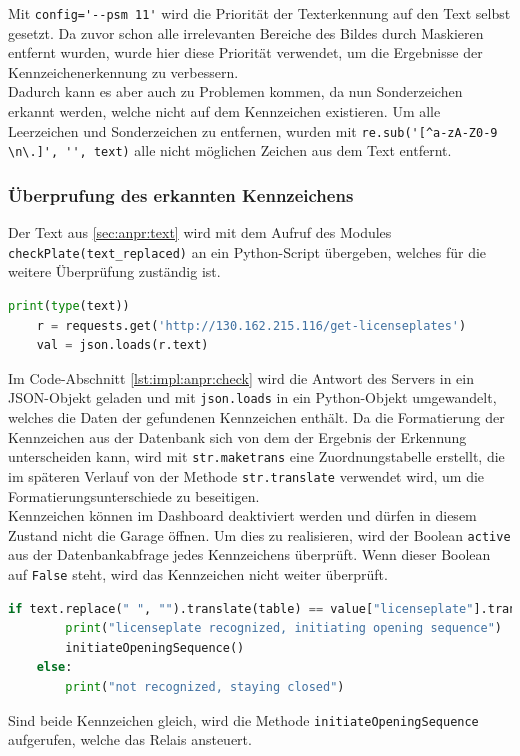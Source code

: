 Mit \verb|config='--psm 11'| wird die Priorität der Texterkennung auf den Text selbst gesetzt. Da zuvor schon alle irrelevanten Bereiche des Bildes durch Maskieren entfernt wurden, wurde hier diese Priorität verwendet, um die Ergebnisse der Kennzeichenerkennung zu verbessern. \cite{PSM11} \\
Dadurch kann es aber auch zu Problemen kommen, da nun Sonderzeichen erkannt werden, welche nicht auf dem Kennzeichen existieren. Um alle Leerzeichen und Sonderzeichen zu entfernen, wurden mit \verb|re.sub('[^a-zA-Z0-9 \n\.]', '', text)| alle nicht möglichen Zeichen aus dem Text entfernt.


\subsubsection{Überprufung des erkannten Kennzeichens}
Der Text aus \ref{sec:anpr:text} wird mit dem Aufruf des Modules \verb|checkPlate(text_replaced)| an ein Python-Script übergeben, welches für die weitere Überprüfung zuständig ist. 

\begin{lstlisting}[language=Python, caption=Abfrage der Kennzeichen aus der Datenbank, label=lst:impl:anpr:check:db]
    print(type(text))
    r = requests.get('http://130.162.215.116/get-licenseplates')
    val = json.loads(r.text)
\end{lstlisting}

Im Code-Abschnitt \ref{lst:impl:anpr:check} wird die Antwort des Servers in ein JSON-Objekt geladen und mit \verb|json.loads| in ein Python-Objekt umgewandelt, welches die Daten der gefundenen Kennzeichen enthält. Da die Formatierung der Kennzeichen aus der Datenbank sich von dem der Ergebnis der Erkennung unterscheiden kann, wird mit \verb|str.maketrans| eine Zuordnungstabelle erstellt, die im späteren Verlauf von der Methode \verb|str.translate| verwendet wird, um die Formatierungsunterschiede zu beseitigen.\\
Kennzeichen können im Dashboard deaktiviert werden und dürfen in diesem Zustand nicht die Garage öffnen. Um dies zu realisieren, wird der Boolean \verb|active| aus der Datenbankabfrage jedes Kennzeichens überprüft. Wenn dieser Boolean auf \verb|False| steht, wird das Kennzeichen nicht weiter überprüft. 

 \begin{lstlisting}[language=Python, caption=Überprüfung auf Gleichheit der beiden Strings, label=lst:impl:anpr:check]
    if text.replace(" ", "").translate(table) == value["licenseplate"].translate(table).replace(" ", ""):
        print("licenseplate recognized, initiating opening sequence")
        initiateOpeningSequence()
    else:
        print("not recognized, staying closed")
 \end{lstlisting}
 Sind beide Kennzeichen gleich, wird die Methode \verb|initiateOpeningSequence| aufgerufen, welche das Relais ansteuert.